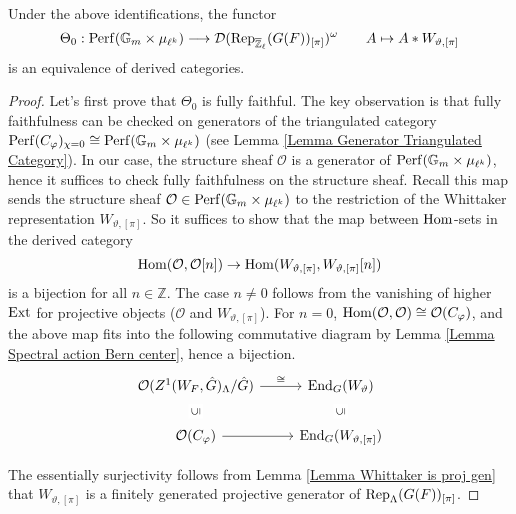 \begin{proposition}
	Under the above identifications, the functor
	$$\Theta_0: \operatorname{\operatorname{Perf}}(\mathbb{G}_m \times \mu_{\ell^k}) \longrightarrow \mathcal{D}(\operatorname{\operatorname{Rep}}_{\overline{\mathbb{Z}}_{\ell}}(G(F))_{[\pi]})^{\omega} \qquad A \mapsto A*W_{\vartheta, [\pi]}$$
	is an equivalence of derived categories.
\end{proposition}


\begin{proof}
	Let's first prove that $\Theta_0$ is fully faithful. The key observation is that fully faithfulness can be checked on generators of the triangulated category $\operatorname{\operatorname{Perf}}(C_{\varphi})_{\chi=0} \cong \operatorname{\operatorname{Perf}}(\mathbb{G}_m \times \mu_{\ell^k})$ (see Lemma \ref{Lemma Generator Triangulated Category}). In our case, the structure sheaf $\mathcal{O}$ is a generator of $\operatorname{\operatorname{Perf}}(\mathbb{G}_m \times \mu_{\ell^k})$, hence it suffices to check fully faithfulness on the structure sheaf. Recall this map sends the structure sheaf $\mathcal{O} \in \operatorname{\operatorname{Perf}}(\mathbb{G}_m \times \mu_{\ell^k})$ to the restriction of the Whittaker representation $W_{\vartheta, [\pi]}$. So it suffices to show that the map between $\operatorname{\operatorname{Hom}}$-sets in the derived category
	$$\operatorname{\operatorname{Hom}}(\mathcal{O}, \mathcal{O}[n]) \to \operatorname{\operatorname{Hom}}(W_{\vartheta, [\pi]}, W_{\vartheta, [\pi]}[n])$$
	is a bijection for all $n \in \mathbb{Z}$. The case $n \neq 0$ follows from the vanishing of higher $\operatorname{\operatorname{Ext}}$ for projective objects ($\mathcal{O}$ and $W_{\vartheta, [\pi]}$). For $n=0$, $\operatorname{\operatorname{Hom}}(\mathcal{O}, \mathcal{O}) \cong \mathcal{O}(C_{\varphi})$, and the above map fits into the following commutative diagram by Lemma \ref{Lemma Spectral action Bern center}, hence a bijection.
		\[\begin{tikzcd}
			{\mathcal{O}(Z^1(W_F, \hat{G})_{\Lambda}/\hat{G})} & {\End_{G}(W_{\vartheta})} \\
			{\mathcal{O}(C_{\varphi})} & {\End_{G}(W_{\vartheta, [\pi]})}
			\arrow[from=2-1, to=2-2]
			\arrow["\subseteq"{description}, sloped, draw=none, from=2-1, to=1-1]
			\arrow["\subseteq"{description}, sloped, draw=none, from=2-2, to=1-2]
			\arrow["\cong", from=1-1, to=1-2]
		\end{tikzcd}\]
		
	
	The essentially surjectivity follows from Lemma \ref{Lemma Whittaker is proj gen} that $W_{\vartheta, [\pi]}$ is a finitely generated projective generator of $\operatorname{\operatorname{Rep}}_{\Lambda}(G(F))_{[\pi]}$.
	
\end{proof}


